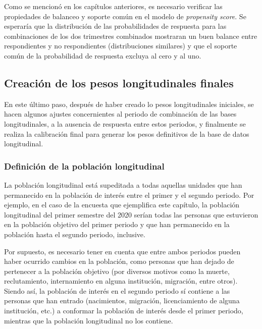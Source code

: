 \documentclass[
  12pt,
]{book}
\begin{document}
Como se mencionó en los capítulos anteriores, es necesario verificar las propiedades de balanceo y soporte común en el modelo de \emph{propensity score}. Se esperaría que la distribución de las probabilidades de respuesta para las combinaciones de los dos trimestres combinados mostraran un buen balance entre respondientes y no respondientes (distribuciones similares) y que el soporte común de la probabilidad de respuesta excluya al cero y al uno.

\hypertarget{creaciuxf3n-de-los-pesos-longitudinales-finales}{%
\subsection{Creación de los pesos longitudinales finales}\label{creaciuxf3n-de-los-pesos-longitudinales-finales}}

En este último paso, después de haber creado lo pesos longitudinales iniciales, se hacen algunos ajustes concernientes al periodo de combinación de las bases longitudinales, a la ausencia de respuesta entre estos periodos, y finalmente se realiza la calibración final para generar los pesos definitivos de la base de datos longitudinal.

\hypertarget{definiciuxf3n-de-la-poblaciuxf3n-longitudinal}{%
\subsubsection{Definición de la población longitudinal}\label{definiciuxf3n-de-la-poblaciuxf3n-longitudinal}}

La población longitudinal está supeditada a todas aquellas unidades que han permanecido en la población de interés entre el primer y el segundo periodo. Por ejemplo, en el caso de la encuesta que ejemplifica este capítulo, la población longitudinal del primer semestre del 2020 serían todas las personas que estuvieron en la población objetivo del primer periodo y que han permanecido en la población hasta el segundo periodo, inclusive.

Por supuesto, es necesario tener en cuenta que entre ambos periodos pueden haber ocurrido cambios en la población, como personas que han dejado de pertenecer a la población objetivo (por diversos motivos como la muerte, reclutamiento, internamiento en alguna institución, migración, entre otros). Siendo así, la población de interés en el segundo periodo sí contiene a las personas que han entrado (nacimientos, migración, licenciamiento de alguna institución, etc.) a conformar la población de interés desde el primer periodo, mientras que la población longitudinal no los contiene.
\end{document}
